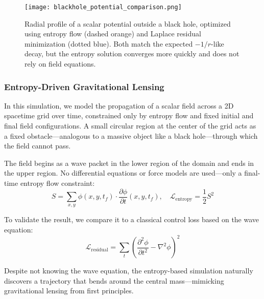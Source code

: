 \documentclass[12pt]{article}
\begin{document}
\begin{figure}[H]
\centering
\texttt{[image: blackhole\_potential\_comparison.png]}
\caption{
Radial profile of a scalar potential outside a black hole, optimized using entropy flow (dashed orange) and Laplace residual minimization (dotted blue). Both match the expected \(-1/r\)-like decay, but the entropy solution converges more quickly and does not rely on field equations.
}
\end{figure}


\subsubsection{Entropy-Driven Gravitational Lensing}

In this simulation, we model the propagation of a scalar field across a 2D spacetime grid over time, constrained only by entropy flow and fixed initial and final field configurations. A small circular region at the center of the grid acts as a fixed obstacle—analogous to a massive object like a black hole—through which the field cannot pass.

The field begins as a wave packet in the lower region of the domain and ends in the upper region. No differential equations or force models are used—only a final-time entropy flow constraint:
\[
S = \sum_{x,y} \phi(x, y, t_f) \cdot \frac{\partial \phi}{\partial t}(x, y, t_f),
\quad \mathcal{L}_{\text{entropy}} = \frac{1}{2} S^2
\]

To validate the result, we compare it to a classical control loss based on the wave equation:
\[
\mathcal{L}_{\text{residual}} = \sum_t \left( \frac{\partial^2 \phi}{\partial t^2} - \nabla^2 \phi \right)^2
\]

Despite not knowing the wave equation, the entropy-based simulation naturally discovers a trajectory that bends around the central mass—mimicking gravitational lensing from first principles.
\end{document}
